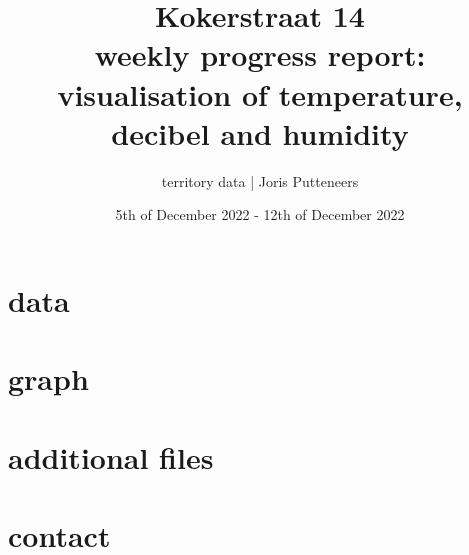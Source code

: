 \documentclass{article}
\author{territory data | Joris Putteneers}
\title{Kokerstraat 14\\ \large weekly progress report: visualisation of {temperature, decibel} and humidity}
\date{5th of December 2022 - 12th of December 2022}
\begin{document}
  
\maketitle  
\tableofcontents 
\newpage 
\section{data} 
 
\section{graph} 
 
\section{additional files} 
 
\section{contact} 
 
\end{document}
